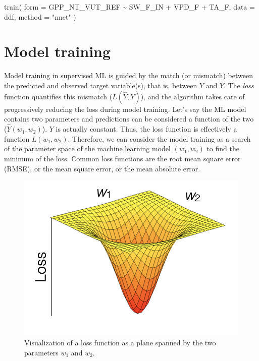 \documentclass[
]{book}
\newenvironment{Shaded}{\begin{snugshade}}{\end{snugshade}}
\newcommand{\AttributeTok}[1]{\textcolor[rgb]{0.77,0.63,0.00}{#1}}
\newcommand{\FunctionTok}[1]{\textcolor[rgb]{0.00,0.00,0.00}{#1}}
\newcommand{\NormalTok}[1]{#1}
\newcommand{\SpecialCharTok}[1]{\textcolor[rgb]{0.00,0.00,0.00}{#1}}
\newcommand{\StringTok}[1]{\textcolor[rgb]{0.31,0.60,0.02}{#1}}
\begin{document}
\begin{Shaded}
\begin{Highlighting}[]
\FunctionTok{train}\NormalTok{(}
  \AttributeTok{form =}\NormalTok{ GPP\_NT\_VUT\_REF }\SpecialCharTok{\textasciitilde{}}\NormalTok{ SW\_F\_IN }\SpecialCharTok{+}\NormalTok{ VPD\_F }\SpecialCharTok{+}\NormalTok{ TA\_F, }
  \AttributeTok{data =}\NormalTok{ ddf, }
  \AttributeTok{method =} \StringTok{"nnet"}
\NormalTok{)}
\end{Highlighting}
\end{Shaded}

\hypertarget{training}{%
\chapter{Model training}\label{training}}

Model training in supervised ML is guided by the match (or mismatch) between the predicted and observed target variable(s), that is, between \(\hat{Y}\) and \(Y\). The \emph{loss} function quantifies this mismatch (\(L(\hat{Y}, Y)\)), and the algorithm takes care of progressively reducing the loss during model training. Let's say the ML model contains two parameters and predictions can be considered a function of the two (\(\hat{Y}(w_1, w_2)\)). \(Y\) is actually constant. Thus, the loss function is effectively a function \(L(w_1, w_2)\). Therefore, we can consider the model training as a search of the parameter space of the machine learning model \((w_1, w_2)\) to find the minimum of the loss. Common loss functions are the root mean square error (RMSE), or the mean square error, or the mean absolute error.

\begin{figure}
\includegraphics[width=11.5in]{./fig/loss_plane} \caption{Visualization of a loss function as a plane spanned by the two parameters $w_1$ and $w_2$.}\label{fig:unnamed-chunk-20}
\end{figure}
\end{document}
